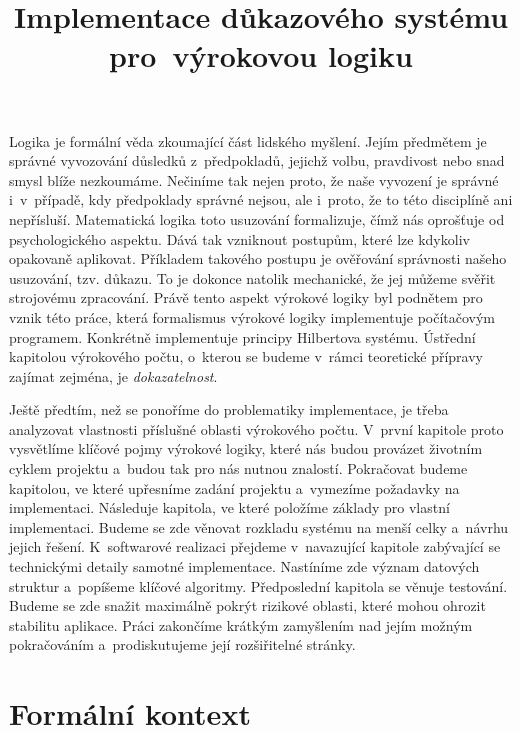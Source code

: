 \documentclass[thesis=B,czech,hidelinks]{thesis}[2012/06/26]
\title{Implementace důkazového systému pro~výrokovou logiku}
\begin{document}
\theoremstyle{definition}
\newtheorem{exm}{Příklad}
\newtheorem{dfn}{Definice}


%
%
%

\begin{introduction}
Logika je formální věda zkoumající část lidského myšlení. Jejím předmětem je správné vyvozování důsledků z~předpokladů, jejichž volbu, pravdivost nebo snad smysl blíže nezkoumáme. Nečiníme tak nejen proto, že naše vyvození je správné i~v~případě, kdy předpoklady správné nejsou, ale i~proto, že to této disciplíně ani nepřísluší. Matematická logika toto usuzování formalizuje, čímž nás oprošťuje od psychologického aspektu. Dává tak vzniknout postupům, které lze kdykoliv opakovaně aplikovat. Příkladem takového postupu je ověřování správnosti našeho usuzování, tzv. důkazu. To je dokonce natolik mechanické, že jej můžeme svěřit strojovému zpracování\cite{sochor}. Právě tento aspekt výrokové logiky byl podnětem pro vznik této práce, která formalismus výrokové logiky implementuje počítačovým programem. Konkrétně implementuje principy Hilbertova systému. Ústřední kapitolou výrokového počtu, o~kterou se budeme v~rámci teoretické přípravy zajímat zejména, je \emph{dokazatelnost}.

Ještě předtím, než se ponoříme do problematiky implementace, je třeba analyzovat vlastnosti příslušné oblasti výrokového počtu. V~první kapitole proto vysvětlíme klíčové pojmy výrokové logiky, které nás budou provázet životním cyklem projektu a~budou tak pro nás nutnou znalostí. Pokračovat budeme kapitolou, ve které upřesníme zadání projektu a~vymezíme požadavky na implementaci. Následuje kapitola, ve které položíme základy pro vlastní implementaci. Budeme se zde věnovat rozkladu systému na menší celky a~návrhu jejich řešení. K~softwarové realizaci přejdeme v~navazující kapitole zabývající se technickými detaily samotné implementace. Nastíníme zde význam datových struktur a~popíšeme klíčové algoritmy. Předposlední kapitola se věnuje testování. Budeme se zde snažit maximálně pokrýt rizikové oblasti, které mohou ohrozit stabilitu aplikace. Práci zakončíme krátkým zamyšlením nad jejím možným pokračováním a~prodiskutujeme její rozšiřitelné stránky.
\end{introduction}

%
%
%

\chapter{Formální kontext}
\end{document}
